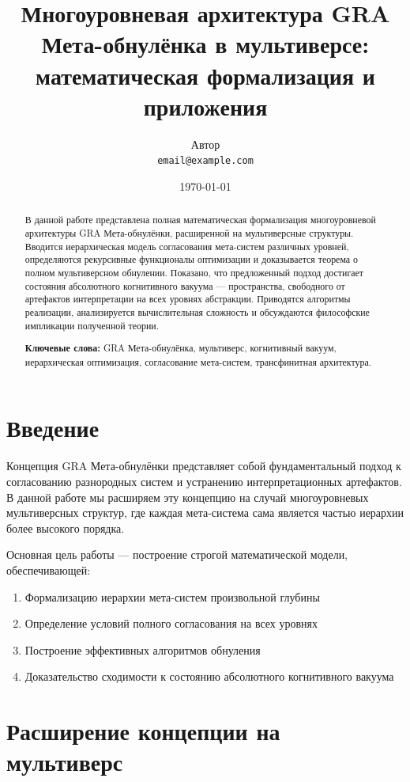 \documentclass[12pt,a4paper]{article}
\title{\textbf{Многоуровневая архитектура GRA Мета-обнулёнка в мультиверсе:\\
математическая формализация и приложения}}
\author{
    Автор\\
    \texttt{email@example.com}
}
\date{\today}
\begin{document}
\maketitle

\begin{abstract}
В данной работе представлена полная математическая формализация многоуровневой архитектуры GRA Мета-обнулёнки, расширенной на мультиверсные структуры. Вводится иерархическая модель согласования мета-систем различных уровней, определяются рекурсивные функционалы оптимизации и доказывается теорема о полном мультиверсном обнулении. Показано, что предложенный подход достигает состояния абсолютного когнитивного вакуума --- пространства, свободного от артефактов интерпретации на всех уровнях абстракции. Приводятся алгоритмы реализации, анализируется вычислительная сложность и обсуждаются философские импликации полученной теории.

\textbf{Ключевые слова:} GRA Мета-обнулёнка, мультиверс, когнитивный вакуум, иерархическая оптимизация, согласование мета-систем, трансфинитная архитектура.
\end{abstract}

\tableofcontents
\newpage

\section{Введение}

Концепция GRA Мета-обнулёнки представляет собой фундаментальный подход к согласованию разнородных систем и устранению интерпретационных артефактов. В данной работе мы расширяем эту концепцию на случай многоуровневых мультиверсных структур, где каждая мета-система сама является частью иерархии более высокого порядка.

Основная цель работы --- построение строгой математической модели, обеспечивающей:
\begin{enumerate}[label=\arabic*)]
    \item Формализацию иерархии мета-систем произвольной глубины
    \item Определение условий полного согласования на всех уровнях
    \item Построение эффективных алгоритмов обнуления
    \item Доказательство сходимости к состоянию абсолютного когнитивного вакуума
\end{enumerate}

\section{Расширение концепции на мультиверс}
\end{document}
